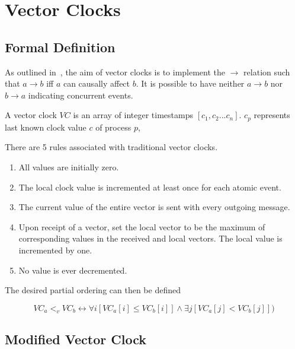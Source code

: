 \documentclass[12pt,a4paper,twoside,openright]{report}
\begin{document}
\printbibliography

\appendix

\chapter{Vector Clocks}

\section{Formal Definition}
\label{appendix:vectorclocks}

As outlined in~\cite{fidge1987}, the aim of vector clocks is to implement the $\rightarrow$ relation such that $ a \rightarrow b$ iff $a$ can causally affect $b$. It is possible to have neither $a \rightarrow b$ nor $b \rightarrow a$ indicating concurrent events.

A vector clock $VC$ is an array of integer timestamps $[c_1, c_2...c_n]$. $c_p$ represents last known clock value $c$ of process $p$, 

There are 5 rules associated with traditional vector clocks.
\begin{enumerate}
	\item All values are initially zero.
	\item The local clock value is incremented at least once for each atomic event.
	\item The current value of the entire vector is sent with every outgoing message.
	\item Upon receipt of a vector, set the local vector to be the maximum of corresponding values in the received and local vectors. The local value is incremented by one.
	\item No value is ever decremented.
\end{enumerate}

The desired partial ordering can then be defined

\[VC_a <_v VC_b \leftrightarrow \forall i[VC_a[i] \leq VC_b[i]] \land \exists j[VC_a[j] < VC_b[j]])\]



\section{Modified Vector Clock}
\label{appendix:modifiedvector}
\end{document}
